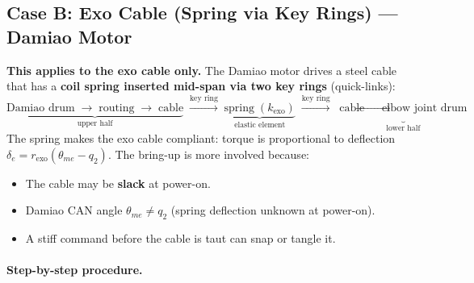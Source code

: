 \documentclass[11pt,a4paper]{article}
\begin{document}
\subsection{Case B: Exo Cable (Spring via Key Rings) --- Damiao Motor}
\label{sec:caseB}

\textbf{This applies to the exo cable only.}
The Damiao motor drives a steel cable that has a \textbf{coil spring inserted
mid-span via two key rings} (quick-links):
\[
  \underbrace{\text{Damiao drum}\;\to\;\text{routing}\;\to\;\text{cable}}_{\text{upper half}}
  \;\xrightarrow{\text{key ring}}\;
  \underbrace{\text{spring}\;(k_{\mathrm{exo}})}_{\text{elastic element}}
  \;\xrightarrow{\text{key ring}}\;
  \underbrace{\text{cable}\;\to\;\text{elbow joint drum}}_{\text{lower half}}
\]
The spring makes the exo cable compliant: torque is proportional to deflection
$\delta_e = r_{\mathrm{exo}}(\theta_{me} - q_2)$.
The bring-up is more involved because:
\begin{itemize}[leftmargin=2em]
  \item The cable may be \textbf{slack} at power-on.
  \item Damiao CAN angle $\theta_{me} \neq q_2$ (spring deflection unknown at power-on).
  \item A stiff command before the cable is taut can snap or tangle it.
\end{itemize}

\paragraph{Step-by-step procedure.}
\end{document}
